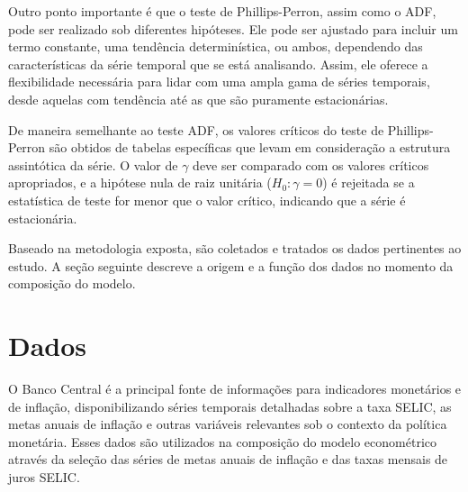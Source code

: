 \documentclass[12pt,oneside,a4paper,chapter=TITLE,english,brazil,sumario=abnt-6027-2012]{abntex2}
\begin{document}
Outro ponto importante é que o teste de Phillips-Perron, assim como o ADF, pode ser realizado sob diferentes hipóteses. Ele pode ser ajustado para incluir um termo constante, uma tendência determinística, ou ambos, dependendo das características da série temporal que se está analisando. Assim, ele oferece a flexibilidade necessária para lidar com uma ampla gama de séries temporais, desde aquelas com tendência até as que são puramente estacionárias.

De maneira semelhante ao teste ADF, os valores críticos do teste de Phillips-Perron são obtidos de tabelas específicas que levam em consideração a estrutura assintótica da série. O valor de \( \gamma \) deve ser comparado com os valores críticos apropriados, e a hipótese nula de raiz unitária (\( H_0: \gamma = 0 \)) é rejeitada se a estatística de teste for menor que o valor crítico, indicando que a série é estacionária.


Baseado na metodologia exposta, são coletados e tratados os dados pertinentes ao estudo. A seção seguinte descreve a origem e a função dos dados no momento da composição do modelo.

\section{Dados}






O Banco Central é a principal fonte de informações para indicadores monetários e de inflação, disponibilizando séries temporais detalhadas sobre a taxa SELIC, as metas anuais de inflação e outras variáveis relevantes sob o contexto da política monetária. Esses dados são utilizados na composição do modelo econométrico através da seleção das séries de metas anuais de inflação e das taxas mensais de juros SELIC. 
\end{document}
